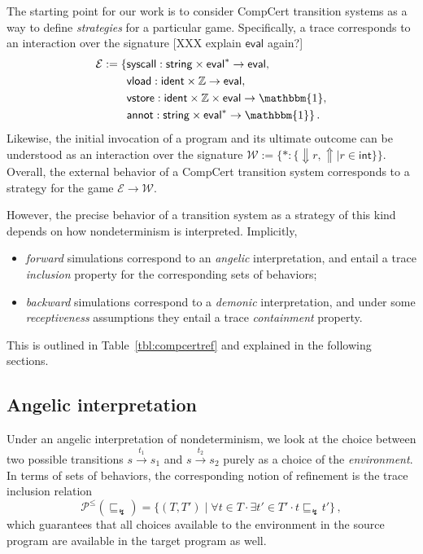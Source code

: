 \documentclass[sigplan,10pt,review,anonymous]{acmart}
\newcommand{\kw}[1]{\ensuremath{\mathsf{#1}}}
\newcommand{\refby}{\sqsubseteq}
\newcommand{\bdot}{\cdot}
\begin{document}
The starting point for our work
is to consider CompCert transition systems
as a way to define \emph{strategies}
for a particular game.
Specifically,
a trace corresponds to an interaction
over the signature
[XXX explain $\kw{eval}$ again?]
\begin{align*}
  \mathcal{E} := \{ {}
    &\kw{syscall} :
      \kw{string} \times \kw{eval}^* \rightarrow \kw{eval},
      \\
    &\kw{vload} :
      \kw{ident} \times \mathbb{Z} \rightarrow \kw{eval},
      \\
    &\kw{vstore} :
      \kw{ident} \times \mathbb{Z} \times \kw{eval} \rightarrow \mathbbm{1},
      \\
    &\kw{annot} :
      \kw{string} \times \kw{eval}^* \rightarrow \mathbbm{1}
  \}
  \,.
\end{align*}
Likewise,
the initial invocation of a program
and its ultimate outcome can
be understood as an interaction over the signature
$
  \mathcal{W} := \{
    {*} : \{ {\Downarrow} r, {\Uparrow} \mid r \in \kw{int} \}
  \}
$.
Overall,
the external behavior of
a CompCert transition system
corresponds to a strategy
for the game $\mathcal{E} \rightarrow \mathcal{W}$.

However,
the precise behavior of a transition system
as a strategy of this kind
depends on how nondeterminism is interpreted.
Implicitly,
\begin{itemize}
  \item
    \emph{forward} simulations
    correspond to an \emph{angelic} interpretation,
    and entail a trace \emph{inclusion} property
    for the corresponding sets of behaviors;
  \item
    \emph{backward} simulations
    correspond to a \emph{demonic} interpretation, and
    under some \emph{receptiveness} assumptions
    they entail a trace \emph{containment} property.
\end{itemize}
This is outlined in Table~\ref{tbl:compcertref}
and explained in the following sections.


\subsection{Angelic interpretation} \label{sec:sem:fsim} %

Under an angelic interpretation of nondeterminism,
we look at the choice between two possible transitions
$
  s \stackrel{t_1}{\longrightarrow} s_1
$
and
$
  s \stackrel{t_2}{\longrightarrow} s_2
$
purely as a choice of the \emph{environment}.
In terms of sets of behaviors,
the corresponding notion of refinement
is the trace inclusion relation
\[
  \mathcal{P}^\le({\refby_\lightning}) =
  \{ (T, T') \mid \forall t \in T \bdot \exists t' \in T' \bdot
      t \refby_\lightning t' \}
  \,,
\]
which guarantees that
all choices available to the environment in the source program
are available in the target program as well.
\end{document}
